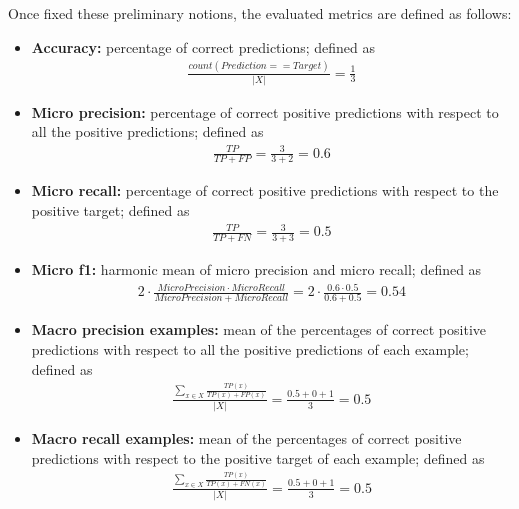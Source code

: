Once fixed these preliminary notions, the evaluated metrics are defined as follows:

\begin{itemize}
    \item \textbf{Accuracy:} percentage of correct predictions; defined as 
    \begin{gather*}
        \frac{count(Prediction == Target)}{|X|} = \frac{1}{3}
    \end{gather*}
    
    \item \textbf{Micro precision:} percentage of correct positive predictions with respect to all the positive predictions; defined as
    \begin{gather*}
        \frac{TP}{TP + FP} = \frac{3}{3 + 2} = 0.6
    \end{gather*}
    
    \item \textbf{Micro recall:} percentage of correct positive predictions with respect to the positive target; defined as
    \begin{gather*}
        \frac{TP}{TP + FN} = \frac{3}{3 + 3} = 0.5
    \end{gather*}
    
    \item \textbf{Micro f1:} harmonic mean of micro precision and micro recall; defined as
    \begin{gather*}
        2 \cdot \frac{MicroPrecision \cdot MicroRecall}{MicroPrecision + MicroRecall} =
        2 \cdot \frac{0.6 \cdot 0.5}{0.6 + 0.5} = 0.54
    \end{gather*}
    
    \item \textbf{Macro precision examples:} mean of the percentages of correct positive predictions with respect to all the positive predictions of each example; defined as
    \begin{gather*}
        \frac{\sum_{x \in X}\frac{TP(x)}{TP(x) + FP(x)}}{|X|}=
        \frac{0.5 + 0 + 1}{3}=0.5
    \end{gather*}
    
    \item \textbf{Macro recall examples:} mean of the percentages of correct positive predictions with respect to the positive target of each example; defined as
    \begin{gather*}
        \frac{\sum_{x \in X}\frac{TP(x)}{TP(x) + FN(x)}}{|X|}=
        \frac{0.5 + 0 + 1}{3}=0.5
    \end{gather*}
    

\end{itemize}
